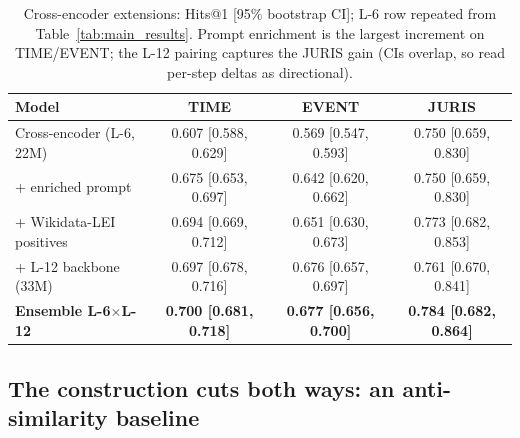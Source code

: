 \documentclass[sigconf]{acmart}
\begin{document}
\begin{table}[t]
  \centering\scriptsize
  \setlength{\tabcolsep}{2.5pt}
  \caption{Cross-encoder extensions: Hits@1 [95\% bootstrap
    CI]; L-6 row repeated from Table~\ref{tab:main_results}.
    Prompt enrichment is the largest increment on TIME/EVENT; the
    L-12 pairing captures the JURIS gain (CIs overlap, so read
    per-step deltas as directional).}
  \label{tab:v7}
  \begin{tabular}{@{}l c c c@{}}
    \toprule
    Model & TIME & EVENT & JURIS \\
    \midrule
    Cross-encoder (L-6, 22M)        & 0.607 [0.588, 0.629] & 0.569 [0.547, 0.593] & 0.750 [0.659, 0.830] \\
    + enriched prompt               & 0.675 [0.653, 0.697] & 0.642 [0.620, 0.662] & 0.750 [0.659, 0.830] \\
    + Wikidata-LEI positives        & 0.694 [0.669, 0.712] & 0.651 [0.630, 0.673] & 0.773 [0.682, 0.853] \\
    + L-12 backbone (33M)           & 0.697 [0.678, 0.716] & 0.676 [0.657, 0.697] & 0.761 [0.670, 0.841] \\
    \textbf{Ensemble L-6$\times$L-12} & \textbf{0.700 [0.681, 0.718]} & \textbf{0.677 [0.656, 0.700]} & \textbf{0.784 [0.682, 0.864]} \\
    \bottomrule
  \end{tabular}
\end{table}


\subsection{The construction cuts both ways: an anti-similarity baseline}
\label{ssec:anti}
\end{document}
